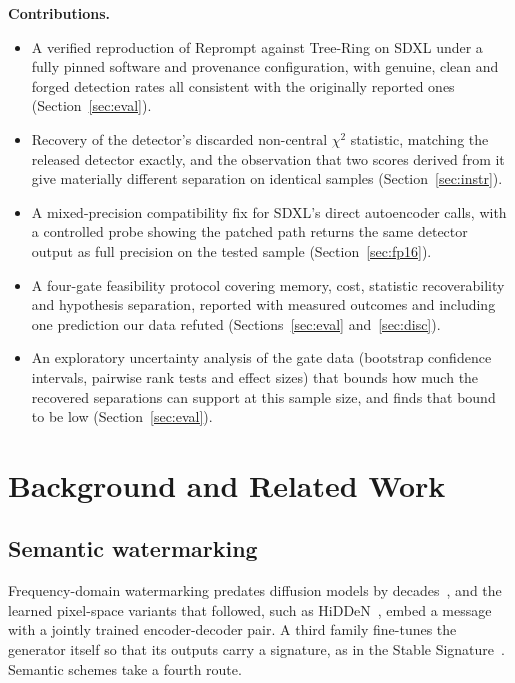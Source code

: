 \documentclass[10pt,twocolumn]{article}
\begin{document}
\vspace{2pt}
\noindent\textbf{Contributions.}
\begin{itemize}\itemsep2pt
  \item A verified reproduction of Reprompt against Tree-Ring on SDXL under a fully
        pinned software and provenance configuration, with genuine, clean and forged
        detection rates all consistent with the originally reported ones
        (Section~\ref{sec:eval}).
  \item Recovery of the detector's discarded non-central $\chi^2$ statistic, matching
        the released detector exactly, and the observation that two scores derived
        from it give materially different separation on identical samples
        (Section~\ref{sec:instr}).
  \item A mixed-precision compatibility fix for SDXL's direct autoencoder calls,
        with a controlled probe showing the patched path returns the same detector
        output as full precision on the tested sample (Section~\ref{sec:fp16}).
  \item A four-gate feasibility protocol covering memory, cost, statistic
        recoverability and hypothesis separation, reported with measured outcomes and
        including one prediction our data refuted (Sections~\ref{sec:eval}
        and~\ref{sec:disc}).
  \item An exploratory uncertainty analysis of the gate data (bootstrap
        confidence intervals, pairwise rank tests and effect sizes) that bounds
        how much the recovered separations can support at this sample size, and
        finds that bound to be low (Section~\ref{sec:eval}).
\end{itemize}

\section{Background and Related Work}

\subsection{Semantic watermarking}

Frequency-domain watermarking predates diffusion models by decades~\cite{cox2007digital},
and the learned pixel-space variants that followed, such as
HiDDeN~\cite{zhu2018hidden}, embed a message with a jointly trained
encoder-decoder pair. A third family fine-tunes the generator itself so that its
outputs carry a signature, as in the Stable
Signature~\cite{fernandez2023stablesignature}. Semantic schemes take a fourth route.
\end{document}
